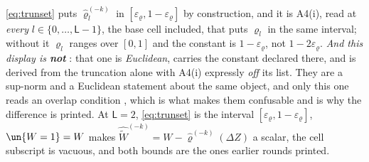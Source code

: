 \begin{definition}
\begin{enumerate}
\eqref{eq:trunset} puts $\hat\varrho^{(-k)}_l$ in $[\varepsilon_\varrho,1-\varepsilon_\varrho]$ by
construction, and it is A4(i), read at \emph{every} $l\in\{0,\dots,\mathsf L-1\}$, the base cell
included, that puts $\varrho_l$ in the same interval; without it $\varrho_l$ ranges over $[0,1]$ and
the constant is $1-\varepsilon_\varrho$, not $1-2\varepsilon_\varrho$. \emph{And this display is
\textbf{not} }: that one is \emph{Euclidean}, carries the constant declared there,
and is derived from the truncation alone with A4(i) expressly \emph{off} its list. They are a
sup-norm and a Euclidean statement about the same object, and only this one reads an overlap condition
, which is what makes them confusable and is why the difference is printed.
At $\mathsf L=2$,
\eqref{eq:trunset} is the interval $[\varepsilon_\varrho,1-\varepsilon_\varrho]$, $\un\{W=1\}=W$ makes
$\widehat{\widetilde W}^{(-k)}=W-\hat\varrho^{(-k)}(\Delta Z)$ a scalar, the cell subscript is vacuous, and
both bounds are the ones earlier rounds printed.

\end{enumerate}
\end{definition}
